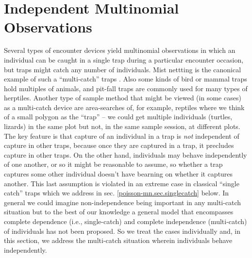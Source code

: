 \section{Independent Multinomial Observations}

Several types of encounter devices yield multinomial observations in
which an individual can be caught in a single trap during a particular
encounter occasion, but traps might catch any number of individuals.
Mist nettting is the canonical example of such a ``multi-catch'' traps
\citep{efford_etal:2009euring}. Also some kinds of bird or mammal
traps hold multiples of animals, and pit-fall traps are commonly used
for many types of herptiles.  Another type of sample method that might
be viewed (in some cases) as a multi-catch device are area-searches
of, for example, reptiles where we think of a small polygon as the
``trap'' -- we could get multiple individuals (turtles, lizards) in
the same plot but not, in the same sample session, at different plots.
The key feature is that capture of an individual in a trap is {\it
  not} independent of capture in other traps, because once they are
captured in a trap, it precludes capture in other traps.  On the other
hand, individuals may behave independently of one another, or so it
might be reasonable to assume, so whether a trap captures some other
individual doesn't have bearning on whether it captures another.  This
last assumption is violated in an extreme case in classical ``single
catch'' traps which we address in
sec. \ref{poisson-mn.sec.singlecatch} below. In general we could
imagine non-independence being important in any multi-catch situation
but to the best of our knowledge a general model that encompasses
complete dependence (i.e., single-catch) and complete independence
(multi-catch) of individuals has not been proposed.  So we treat the
cases individually and, in this section, we address the multi-catch
situation wherein individuals behave independently.


